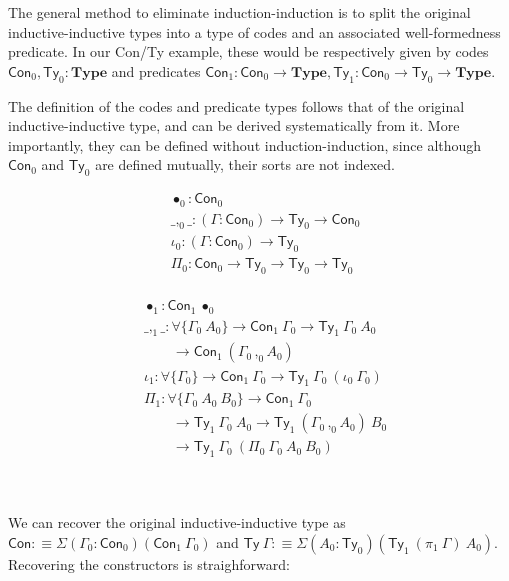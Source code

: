 \documentclass{easychair}
\newcommand{\GG}{\Gamma}
\newcommand{\mType}{\mathbf{Type}}
\begin{document}
The general method to eliminate induction-induction is to split the original
inductive-inductive types into a type of codes and an associated well-formedness
predicate. In our \textsf{Con/Ty} example, these would be respectively given by
codes $\textsf{Con}_0, \textsf{Ty}_0 : \mType$ and predicates $\textsf{Con}_1 :
\textsf{Con}_0 \to \mType, \textsf{Ty}_1 : \textsf{Con}_0 \to \textsf{Ty}_0 \to
\mType$.

The definition of the codes and predicate types follows that of the original
inductive-inductive type, and can be derived systematically from it. More
importantly, they can be defined without induction-induction, since although
$\textsf{Con}_0$ and $\textsf{Ty}_0$ are defined mutually, their sorts are not
indexed.

\begin{minipage}{0.4\textwidth}
\begin{align*}
  & \bullet_0 : \textsf{Con}_0 \\
  & \_,_0\_ : (\GG : \textsf{Con}_0) \to \textsf{Ty}_0 \to \textsf{Con}_0 \\
  & \iota_0 : (\GG : \textsf{Con}_0) \to \textsf{Ty}_0 \\
  & \Pi_0 : \textsf{Con}_0 \to \textsf{Ty}_0 \to \textsf{Ty}_0 \to \textsf{Ty}_0 \\
\end{align*}
\end{minipage}
\begin{minipage}{0.5\textwidth}
\begin{align*}
  & \bullet_1 : \textsf{Con}_1\ \bullet_0 \\
  & \_,_1\_ : \forall\{\GG_0\ A_0\} \to \textsf{Con}_1\ \GG_0 \to \textsf{Ty}_1\ \GG_0\ A_0 \\
  & \qquad \to \textsf{Con}_1\ (\GG_0 \,,_0 A_0) \\
  & \iota_1 : \forall\{\GG_0\} \to \textsf{Con}_1\ \GG_0 \to \textsf{Ty}_1\ \GG_0\ (\iota_0\ \GG_0) \\
  & \Pi_1 : \forall\{\GG_0\ A_0\ B_0\} \to \textsf{Con}_1\ \GG_0 \\
  & \qquad \to \textsf{Ty}_1\ \GG_0\ A_0 \to \textsf{Ty}_1\ (\GG_0\, ,_0 A_0)\ B_0 \\
  & \qquad \to \textsf{Ty}_1\ \GG_0\ (\Pi_0\ \GG_0\ A_0\ B_0)
\end{align*}
\end{minipage}
\\
~
\\

We can recover the original inductive-inductive type as $\textsf{Con} :\equiv
\Sigma (\GG_0 : \textsf{Con}_0)(\textsf{Con}_1\ \GG_0)$ and $\textsf{Ty}\ \GG
:\equiv \Sigma(A_0 :
\textsf{Ty}_0)(\textsf{Ty}_1\ (\pi_1\ \GG)\ A_0)$. Recovering the constructors
is straighforward:
\end{document}
